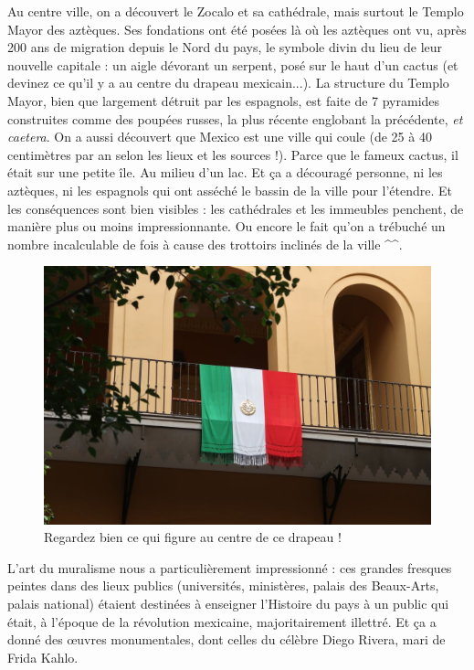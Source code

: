 Au centre ville, on a découvert le Zocalo et sa cathédrale, mais surtout
le Templo Mayor des aztèques. Ses fondations ont été posées là où les
aztèques ont vu, après 200 ans de migration depuis le Nord du pays, le
symbole divin du lieu de leur nouvelle capitale : un aigle dévorant un
serpent, posé sur le haut d'un cactus (et devinez ce qu'il y a au centre
du drapeau mexicain...). La structure du Templo Mayor, bien que
largement détruit par les espagnols, est faite de 7 pyramides
construites comme des poupées russes, la plus récente englobant la
précédente, \emph{et caetera}. On a aussi découvert que Mexico est une
ville qui coule (de 25 à 40 centimètres par an selon les lieux et les
sources !). Parce que le fameux cactus, il était sur une petite île. Au
milieu d'un lac. Et ça a découragé personne, ni les aztèques, ni les
espagnols qui ont asséché le bassin de la ville pour l'étendre. Et les
conséquences sont bien visibles : les cathédrales et les immeubles
penchent, de manière plus ou moins impressionnante. Ou encore le fait
qu'on a trébuché un nombre incalculable de fois à cause des trottoirs
inclinés de la ville \^{}\^{}.

\begin{figure}
\centering
\includegraphics{images/20180930_drapeau.JPG}
\caption{Regardez bien ce qui figure au centre de ce drapeau !}
\end{figure}

L'art du muralisme nous a particulièrement impressionné : ces grandes
fresques peintes dans des lieux publics (universités, ministères, palais
des Beaux-Arts, palais national) étaient destinées à enseigner
l'Histoire du pays à un public qui était, à l'époque de la révolution
mexicaine, majoritairement illettré. Et ça a donné des œuvres
monumentales, dont celles du célèbre Diego Rivera, mari de Frida Kahlo.

